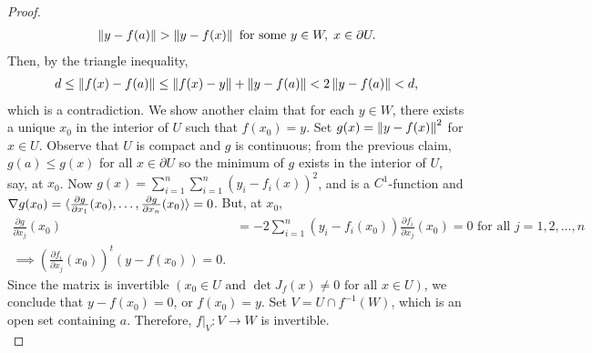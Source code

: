 \begin{proof}
    \begin{align}
        \left\lVert y-f(a)\right\rVert > \left\lVert y-f(x)\right\rVert \text{ for some } y \in W,\;x \in \partial U.
    \end{align}
    Then, by the triangle inequality,
    \begin{align}
        d \leq \left\lVert f(x)-f(a)\right\rVert \leq \left\lVert f(x)-y\right\rVert + \left\lVert y-f(a)\right\rVert < 2\left\lVert y-f(a)\right\rVert < d,
    \end{align}
    which is a contradiction. We show another claim that for each $y \in W$, there exists a unique $x_{0}$ in the interior of $U$ such that $f(x_{0}) = y$. Set $g(x) = \left\lVert y-f(x)\right\rVert^{2}$ for $x \in U$. Observe that $U$ is compact and $g$ is continuous; from the previous claim, $g(a) \leq g(x)$ for all $x \in \partial U$ so the minimum of $g$ exists in the interior of $U$, say, at $x_{0}$. Now $g(x) = \sum_{i=1}^{n} \sum_{i=1}^{n} (y_{i}-f_{i}(x))^{2}$, and is a $C^{1}$-function and $\nabla g(x_{0}) = \langle\frac{\partial g}{\partial x_{1}}(x_{0}),\ldots,\frac{\partial g}{\partial x_{n}}(x_{0})\rangle = 0$. But, at $x_{0}$,
    \begin{align}
        \frac{\partial g}{\partial x_{j}}(x_{0}) &= -2\sum_{i=1}^{n}(y_{i}-f_{i}(x_{0}))\frac{\partial f_{i}}{\partial x_{j}}(x_{0}) = 0 \text{ for all } j = 1,2,\ldots,n \\
        \implies \left( \frac{\partial f_{i}}{\partial x_{j}}(x_{0}) \right)^{t} (y - f(x_{0})) = 0.
    \end{align}
    Since the matrix is invertible $(x_{0} \in U \text{ and } \det J_{f}(x) \neq 0 \text{ for all } x \in U)$, we conclude that $y - f(x_{0}) = 0$, or $f(x_{0}) = y$. Set $V = U \cap f^{-1}(W)$, which is an open set containing $a$. Therefore, $f|_{V}:V \to W$ is invertible.\\


\end{proof}
